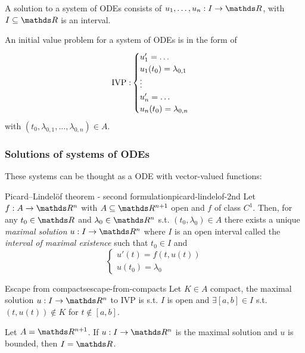 \documentclass[12pt]{extarticle}
\begin{document}
A solution to a system of ODEs consists of $u_1, \dots, u_n: I \to \R$, with $I \subseteq \R$ is an interval.

An initial value problem for a system of ODEs is in the form of
\begin{equation}
    {\operatorfont IVP:}
    \begin{cases}
        u_1' = \ldots             \\
        u_1(t_0) = \lambda_{0, 1} \\
        \vdots                    \\
        u_n' = \ldots             \\
        u_n(t_0) = \lambda_{0, n} \\
    \end{cases}
\end{equation}
with $(t_0, \lambda_{0,1}, \dots, \lambda_{0,n}) \in A$.

\subsubsection{Solutions of systems of ODEs}

These systems can be thought as a ODE with vector-valued functions:
\begin{theorem}{Picard–Lindelöf theorem - second formulation}{picard-lindelof-2nd}
    Let $f: A \to \R^n$ with $A \subseteq \R^{n+1}$ open and $f$ of class $C^1$.
    Then, for any $t_0 \in \R$ and $\lambda_0 \in \R^n$ s.t. $(t_0, \lambda_0) \in A$ there exists a unique \emph{maximal solution}
    $u: I \to \R^n$
    where $I$ is an open interval called the \emph{interval of maximal existence} such that $t_0 \in I$ and
    \begin{equation}
        \begin{cases}
            u'(t) = f(t, u(t)) \\
            u(t_0) = \lambda_0
        \end{cases}
    \end{equation}
\end{theorem}

\begin{theorem}{Escape from compacts}{escape-from-compacts}
    Let $K \in A$ compact, the maximal solution $u: I \to \R^n$ to IVP is s.t. $I$ is open and $\exists [a, b] \in I$ s.t. $(t, u(t)) \notin K$ for $t \notin [a, b]$.
\end{theorem}

\begin{corollary}{}{}
    Let $A = \R^{n+1}$. If $u: I \to \R^n$ is the maximal solution and $u$ is bounded, then $I = \R$.
\end{corollary}
\end{document}
